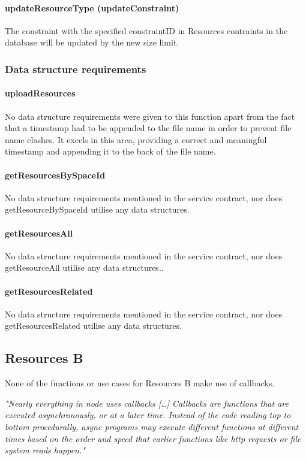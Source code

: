 \documentclass[a4paper]{article}
\begin{document}
\paragraph{updateResourceType (updateConstraint)}
The constraint with the specified constraintID in Resources contraints in the database will be updated by the new size limit.

\subsubsection {Data structure requirements}

\paragraph{uploadResources}
No data structure requirements were given to this function apart from the fact that a timestamp had to be appended to the file name in order to prevent file name clashes. It excels in this area, providing a correct and meaningful timestamp and appending it to the back of the file name.

\paragraph{getResourcesBySpaceId}
No data structure requirements mentioned in the service contract, nor does getResourceBySpaceId utilise any data structures.

\paragraph{getResourcesAll}
No data structure requirements mentioned in the service contract, nor does getResourceAll utilise any data structures..

\paragraph{getResourcesRelated}
No data structure requirements mentioned in the service contract, nor does getResourcesRelated utilise any data structures.

\subsection {Resources B}
None of the functions or use cases for Resources B make use of callbacks.

\textit{ "Nearly everything in node uses callbacks […] Callbacks are functions that are executed asynchronously, or at a later time. Instead of the code reading top to bottom procedurally, async programs may execute different functions at different times based on the order and speed that earlier functions like http requests or file system reads happen."}
\end{document}
